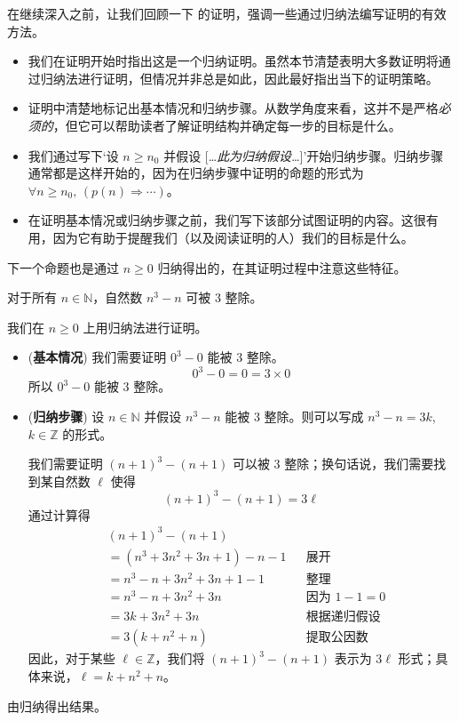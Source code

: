 在继续深入之前，让我们回顾一下  的证明，强调一些通过归纳法编写证明的有效方法。
\begin{itemize}
\item 我们在证明开始时指出这是一个归纳证明。虽然本节清楚表明大多数证明将通过归纳法进行证明，但情况并非总是如此，因此最好指出当下的证明策略。
\item 证明中清楚地标记出基本情况和归纳步骤。从数学角度来看，这并不是严格\textit{必须的}，但它可以帮助读者了解证明结构并确定每一步的目标是什么。
\item 我们通过写下`设 $n \ge n_0$ 并假设 [\dots{}\textit{此为归纳假设}\dots{}]'开始归纳步骤。归纳步骤通常都是这样开始的，因为在归纳步骤中证明的命题的形式为 $\forall n \ge n_0,\, (p(n) \Rightarrow \cdots)$。
\item 在证明基本情况或归纳步骤之前，我们写下该部分试图证明的内容。这很有用，因为它有助于提醒我们（以及阅读证明的人）我们的目标是什么。
\end{itemize}

下一个命题也是通过 $n \ge 0$ 归纳得出的，在其证明过程中注意这些特征。

\begin{proposition}
对于所有 $n \in \mathbb{N}$，自然数 $n^3-n$ 可被 $3$ 整除。
\end{proposition}

\begin{cproof}
我们在 $n \ge 0$ 上用归纳法进行证明。
\begin{itemize}
\item (\textbf{基本情况}) 我们需要证明 $0^3-0$ 能被 $3$ 整除。
\[ 0^3-0 = 0 = 3 \times 0 \]
所以 $0^3-0$ 能被 $3$ 整除。

\item (\textbf{归纳步骤}) 设 $n \in \mathbb{N}$ 并假设 $n^3-n$ 能被 $3$ 整除。则可以写成 $n^3-n = 3k$, $k \in \mathbb{Z}$ 的形式。

我们需要证明 $(n+1)^3 - (n+1)$ 可以被 $3$ 整除；换句话说，我们需要找到某自然数 $\ell$ 使得
\[ (n+1)^3 - (n+1) = 3\ell \]
通过计算得
\begin{align*}
& (n+1)^3 - (n+1) && \\
&= (n^3 + 3n^2 + 3n + 1) - n - 1 && \text{展开}\\
&= n^3 - n + 3n^2 + 3n + 1 - 1 && \text{整理} \\
&= n^3 - n + 3n^2 + 3n && \text{因为 $1 - 1 = 0$} \\
&= 3k + 3n^2 + 3n && \text{根据递归假设} \\
&= 3(k+n^2+n) && \text{提取公因数}
\end{align*}
因此，对于某些 $\ell \in \mathbb{Z}$，我们将 $(n+1)^3-(n+1)$ 表示为 $3\ell$ 形式；具体来说，$\ell=k+n^2+n$。
\end{itemize}

由归纳得出结果。
\end{cproof}

